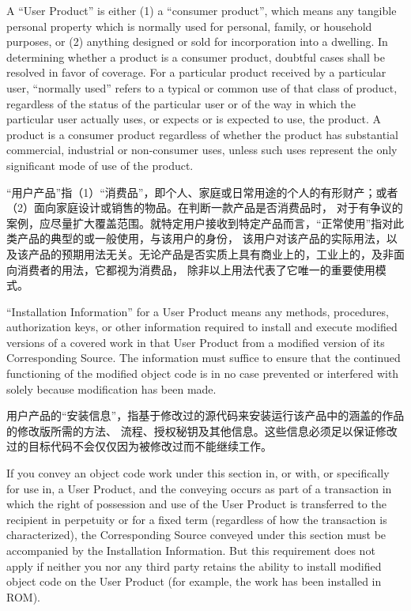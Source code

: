 \documentclass[11pt]{article}
\begin{document}
\begin{enumerate}
        A ``User Product'' is either (1) a ``consumer product'', which means any
        tangible personal property which is normally used for personal, family,
        or household purposes, or (2) anything designed or sold for incorporation
        into a dwelling.  In determining whether a product is a consumer product,
        doubtful cases shall be resolved in favor of coverage.  For a particular
        product received by a particular user, ``normally used'' refers to a
        typical or common use of that class of product, regardless of the status
        of the particular user or of the way in which the particular user
        actually uses, or expects or is expected to use, the product.  A product
        is a consumer product regardless of whether the product has substantial
        commercial, industrial or non-consumer uses, unless such uses represent
        the only significant mode of use of the product.

        “用户产品”指（1）“消费品”，即个人、家庭或日常用途的个人的有形财产；或者（2）面向家庭设计或销售的物品。在判断一款产品是否消费品时，
        对于有争议的案例，应尽量扩大覆盖范围。就特定用户接收到特定产品而言，“正常使用”指对此类产品的典型的或一般使用，与该用户的身份，
        该用户对该产品的实际用法，以及该产品的预期用法无关。无论产品是否实质上具有商业上的，工业上的，及非面向消费者的用法，它都视为消费品，
        除非以上用法代表了它唯一的重要使用模式。


        ``Installation Information'' for a User Product means any methods,
        procedures, authorization keys, or other information required to install
        and execute modified versions of a covered work in that User Product from
        a modified version of its Corresponding Source.  The information must
        suffice to ensure that the continued functioning of the modified object
        code is in no case prevented or interfered with solely because
        modification has been made.

        用户产品的“安装信息”，指基于修改过的源代码来安装运行该产品中的涵盖的作品的修改版所需的方法、
        流程、授权秘钥及其他信息。这些信息必须足以保证修改过的目标代码不会仅仅因为被修改过而不能继续工作。

        If you convey an object code work under this section in, or with, or
        specifically for use in, a User Product, and the conveying occurs as
        part of a transaction in which the right of possession and use of the
        User Product is transferred to the recipient in perpetuity or for a
        fixed term (regardless of how the transaction is characterized), the
        Corresponding Source conveyed under this section must be accompanied
        by the Installation Information.  But this requirement does not apply
        if neither you nor any third party retains the ability to install
        modified object code on the User Product (for example, the work has
        been installed in ROM).


\end{enumerate}
\end{document}
